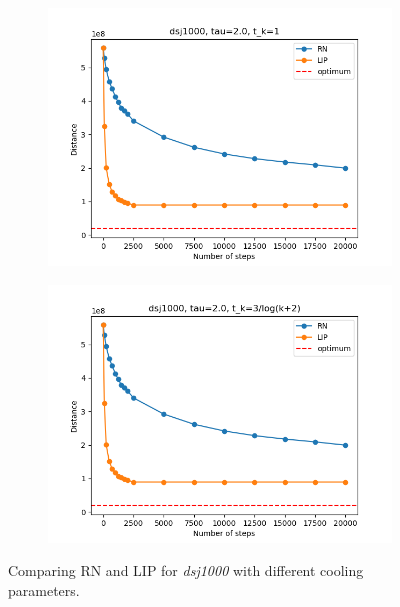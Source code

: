 \begin{figure}[!htb]
	\centering
	\begin{subfigure}{0.45\textwidth}
		\includegraphics[width=\textwidth]{img/dsj1000_temp=2.0_cool=1.0}
	\end{subfigure}
	\begin{subfigure}{0.45\textwidth}
		\includegraphics[width=\textwidth]{img/dsj1000_temp=2.0_cool=2.73}
	\end{subfigure}
	\caption{Comparing RN and LIP for \textit{dsj1000} with different cooling parameters.}
\end{figure}